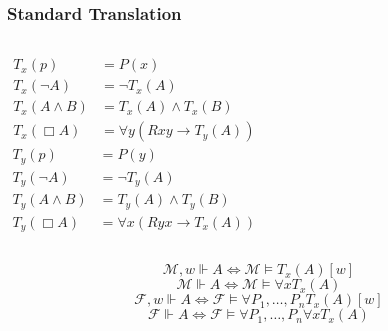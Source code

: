 \documentclass[UTF8,11pt,colorlinks,compress,openany]{beamer}%
\begin{document}
\begin{frame}\frametitle{Standard Translation}
\setlength\abovedisplayskip{0pt}
\setlength\belowdisplayskip{0pt}
	\begin{definition}
		\begin{columns}
				\begin{align*}
				T_x(p)&=P(x)\\
				T_x(\neg A)&=\neg T_x(A)\\
				T_x(A\wedge B)&=T_x(A)\wedge T_x(B)\\
				T_x(\Box A)&=\forall y(Rxy\to T_y(A))
				\end{align*}
				\begin{align*}
				T_y(p)&=P(y)\\
				T_y(\neg A)&=\neg T_y(A)\\
				T_y(A\wedge B)&=T_y(A)\wedge T_y(B)\\
				T_y(\Box A)&=\forall x(Ryx\to T_x(A))
				\end{align*}
		\end{columns}
	\end{definition}
	\begin{theorem}
		\[\mathcal{M},w\Vdash A\iff\mathcal{M}\vDash T_x(A)[w]\]
		\[\mathcal{M}\Vdash A\iff\mathcal{M}\vDash\forall x T_x(A)\]
		\[\mathcal{F},w\Vdash A\iff\mathcal{F}\vDash \forall P_1,\dots,P_nT_x(A)[w]\]
		\[\mathcal{F}\Vdash A\iff\mathcal{F}\vDash\forall P_1,\dots,P_n\forall x T_x(A)\]
	\end{theorem}
\end{frame}
\end{document}
